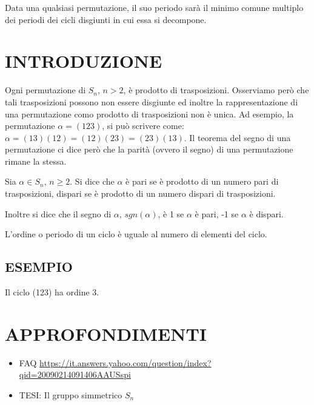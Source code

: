 \begin{definizione}
Data una qualsiasi permutazione, il suo periodo sarà il minimo comune multiplo dei periodi dei cicli disgiunti in cui essa si decompone. 
\end{definizione}

\section{INTRODUZIONE}
Ogni permutazione di $S_n$, $n>2$, è prodotto di trasposizioni. Osserviamo però che tali trasposizioni possono non essere
disgiunte ed inoltre la rappresentazione di una permutazione como prodotto di trasposizioni non è unica. Ad esempio, la permutazione
$\alpha=(123)$, si può scrivere come: $\alpha=(13)(12)=(12)(23)=(23)(13)$. Il teorema del segno di una permutazione ci dice
però che la parità (ovvero il segno) di una permutazione rimane la stessa.

\begin{definizione}
Sia $\alpha \in S_n$, $n \geq 2$. Si dice che $\alpha$ è pari se è prodotto di un numero pari di trasposizioni, dispari se è prodotto di un 
numero dispari di trasposizioni.

Inoltre si dice che il segno di $\alpha$, $sgn(\alpha)$, è 1 se $\alpha$ è pari, -1 se $\alpha$ è dispari.
\end{definizione}

\begin{definizione}
L'ordine o periodo di un ciclo è uguale al numero di elementi del ciclo.
\end{definizione}

\subsection{ESEMPIO}
Il ciclo (123) ha ordine 3.

\section{APPROFONDIMENTI}
\begin{itemize}
 \item FAQ \href{https://it.answers.yahoo.com/question/index?qid=20090214091406AAUSspi}{https://it.answers.yahoo.com/question/index?qid=20090214091406AAUSspi}
 \item TESI: Il gruppo simmetrico $S_n$ 
\end{itemize}




